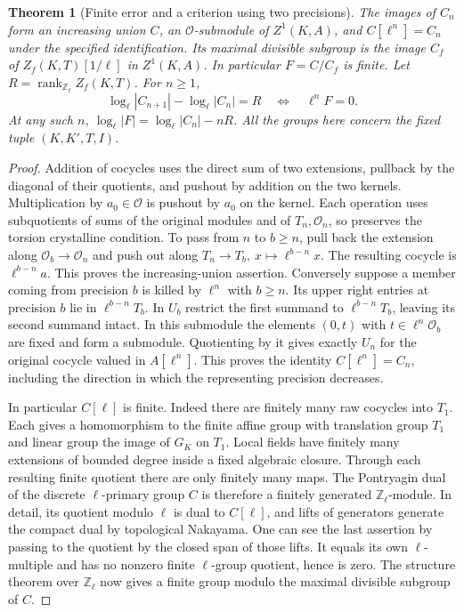 \documentclass[a4paper,11pt]{article}
\newtheorem{theorem}[proposition]{Theorem}
\theoremstyle{definition}
\theoremstyle{remark}
\newcommand{\ZZ}{\mathbb Z}\newcommand{\ord}{\operatorname{ord}}
\numberwithin{equation}{section}
\begin{document}
\begin{theorem}[Finite error and a criterion using two precisions]
\leavevmode\label{thm:localfinite732}
The images of \(C_n\) form an increasing union \(C\), an
\(\mathcal O\)-submodule of \(Z^1(K,A)\), and \(C[\ell^n]=C_n\)
under the specified identification. Its maximal divisible subgroup
is the image \(C_f\) of \(Z_f(K,T)[1/\ell]\) in \(Z^1(K,A)\).
In particular \(F=C/C_f\) is finite. Let
\(R=\operatorname{rank}_{\ZZ_\ell}Z_f(K,T)\). For \(n\ge1\),
\[
 \log_\ell|C_{n+1}|-\log_\ell|C_n|=R
       \quad\Longleftrightarrow\quad \ell^n F=0 .
\]
At any such \(n\), \(\log_\ell|F|=\log_\ell|C_n|-nR\).
All the groups here concern the fixed tuple \((K,K',T,I)\).
\end{theorem}
\begin{proof}
Addition of cocycles uses the direct sum of two extensions, pullback
by the diagonal of their quotients, and pushout by addition on the
two kernels. Multiplication by \(a_0\in\mathcal O\) is pushout by
\(a_0\) on the kernel. Each operation uses subquotients of sums of the
original modules and of \(T_n,\mathcal O_n\), so preserves the torsion
crystalline condition. To pass from \(n\) to \(b\ge n\), pull back the
extension along \(\mathcal O_b\to\mathcal O_n\) and push out along
\(T_n\to T_b,\ x\mapsto\ell^{b-n}x\). The resulting cocycle is
\(\ell^{b-n}a\). This proves the increasing-union assertion.
Conversely suppose a member coming from precision \(b\) is killed
by \(\ell^n\) with \(b\ge n\). Its upper right entries at precision
\(b\) lie in \(\ell^{b-n}T_b\). In \(U_b\) restrict the first
summand to \(\ell^{b-n}T_b\), leaving its second summand intact.
In this submodule the elements \((0,t)\) with \(t\in\ell^n\mathcal O_b\)
are fixed and form a submodule. Quotienting by it gives exactly
\(U_n\) for the original cocycle valued in \(A[\ell^n]\).
This proves the identity \(C[\ell^n]=C_n\), including the direction
in which the representing precision decreases.

In particular \(C[\ell]\) is finite. Indeed there are finitely many
raw cocycles into \(T_1\). Each gives a homomorphism to the finite
affine group with translation group \(T_1\) and linear group the
image of \(G_K\) on \(T_1\). Local fields have finitely many extensions
of bounded degree inside a fixed algebraic closure. Through each
resulting finite quotient there are only finitely many maps.
The Pontryagin dual of the discrete \(\ell\)-primary group \(C\) is
therefore a finitely generated \(\ZZ_\ell\)-module. In detail, its
quotient modulo \(\ell\) is dual to \(C[\ell]\), and lifts of
generators generate the compact dual by topological Nakayama.
One can see the last assertion by passing to the quotient by the
closed span of those lifts. It equals its own \(\ell\)-multiple and
has no nonzero finite \(\ell\)-group quotient, hence is zero.
The structure theorem over \(\ZZ_\ell\) now gives a finite group
modulo the maximal divisible subgroup of \(C\).


\end{proof}
\end{document}
